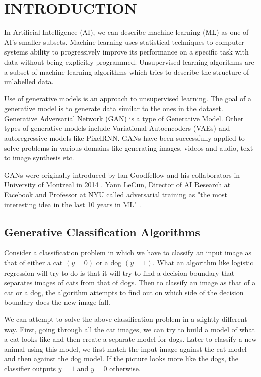 \chapter{INTRODUCTION}
\begin{onehalfspace}
    In Artificial Intelligence (AI), we can describe machine learning (ML) as one 
    of AI's smaller subsets. Machine learning uses statistical techniques to 
    computer systems ability to progressively improve its performance on a specific 
    task with data without being explicitly programmed. \cite{Samuel59somestudies} 
    Unsupervised learning algorithms are a subset of machine learning algorithms 
    which tries to describe the structure of unlabelled data. 

    Use of generative models \cite{openai_genmodels} is an approach to unsupervised 
    learning. The goal of a generative model is to generate data similar to the ones 
    in the dataset. 
    Generative Adversarial Network (GAN) is a type of Generative Model. Other types 
    of generative models include Variational Autoencoders (VAEs) and autoregressive 
    models like PixelRNN. GANs have been successfully applied to solve problems in 
    various domains like generating images, videos and audio, text to image 
    synthesis etc.

    GANs were originally introduced by Ian Goodfellow and his collaborators in 
    University of Montreal in 2014 \cite{gans_basic}.
    Yann LeCun, Director of AI Research at Facebook and Professor at NYU called 
    adversarial training as {"the most interesting idea in the last 10 years 
    in ML"} \cite{yanlecunn_gans}.

    \section{Generative Classification Algorithms}
    Consider a classification problem in which we have to classify an input 
    image as that of either a cat \((y = 0)\) or a dog \((y = 1)\).  What an algorithm 
    like logistic regression will try to do is that it will try to find a 
    decision boundary that separates images of cats from that of dogs. Then to 
    classify an image as that of a cat or a dog, the algorithm attempts to find 
    out on which side of the decision boundary does the new image fall.

    We can attempt to solve the above classification problem in a slightly 
    different way. First, going through all the cat images, we can try to build 
    a model of what a cat looks like and then create a separate model for dogs. 
    Later to classify a new animal using this model, we first match the input 
    image against the cat model and then against the dog model. If the picture 
    looks more like the dogs, the classifier outputs \(y = 1\) and \(y = 0\) otherwise.


\end{onehalfspace}
